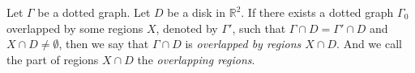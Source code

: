 \documentclass[a4paper,11pt]{amsart}
\numberwithin{equation}{section}
\begin{document}
 

Let $\Gamma$ be a dotted graph. 
Let $D$ be a disk in $\mathbb{R}^2$. 
If there exists a dotted graph $\Gamma_0$ overlapped by some regions $X$, denoted by $\Gamma'$, such that $\Gamma \cap D=\Gamma' \cap D$ and $X \cap D \neq \emptyset$, then  
we say that $\Gamma \cap D$ is {\it overlapped by regions $X \cap D$}. 
And we call the part of regions $X \cap D$ the {\it overlapping regions}. 


 
\end{document}
